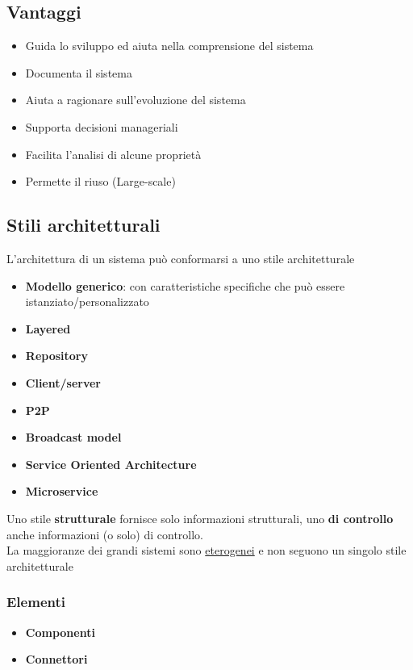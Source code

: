 \documentclass[12pt, a4paper]{report}
\begin{document}
\subsection{Vantaggi}
\begin{itemize}
    \item Guida lo sviluppo ed aiuta nella comprensione del sistema
    \item Documenta il sistema
    \item Aiuta a ragionare sull'evoluzione del sistema
    \item Supporta decisioni manageriali
    \item Facilita l'analisi di alcune proprietà
    \item Permette il riuso (Large-scale)
\end{itemize}
\subsection{Stili architetturali}
L'architettura di un sistema può conformarsi a uno stile architetturale
\begin{itemize}
    \item \textbf{Modello generico}: con caratteristiche specifiche che può essere istanziato/personalizzato
    \item \textbf{Layered}
    \item \textbf{Repository}
    \item \textbf{Client/server}
    \item \textbf{P2P}
    \item \textbf{Broadcast model}
    \item \textbf{Service Oriented Architecture}
    \item \textbf{Microservice}
\end{itemize}
Uno stile \textbf{strutturale} fornisce solo informazioni strutturali, uno \textbf{di controllo} anche informazioni (o solo) di controllo.\\
La maggioranze dei grandi sistemi sono \underline{eterogenei} e non seguono un singolo stile architetturale
\subsubsection{Elementi}
\begin{itemize}
    \item \textbf{Componenti}
    \item \textbf{Connettori}
\end{itemize}
\end{document}
